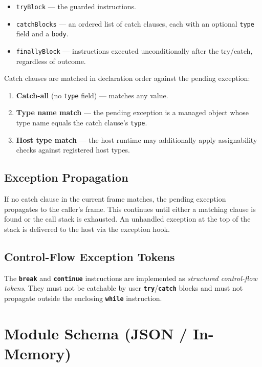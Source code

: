 \documentclass[11pt,a4paper]{article}
\newcommand{\code}[1]{\texttt{\small #1}}
\newcommand{\opcode}[1]{\textbf{\texttt{#1}}}
\begin{document}
\begin{itemize}[leftmargin=1.8em]
  \item \code{tryBlock} --- the guarded instructions.
  \item \code{catchBlocks} --- an ordered list of catch clauses, each with
    an optional \code{type} field and a \code{body}.
  \item \code{finallyBlock} --- instructions executed unconditionally after
    the try/catch, regardless of outcome.
\end{itemize}

Catch clauses are matched in declaration order against the pending exception:

\begin{enumerate}[leftmargin=2em]
  \item \textbf{Catch-all} (no \code{type} field) --- matches any value.
  \item \textbf{Type name match} --- the pending exception is a managed object
    whose type name equals the catch clause's \code{type}.
  \item \textbf{Host type match} --- the host runtime may additionally apply
    assignability checks against registered host types.
\end{enumerate}

\subsection{Exception Propagation}

If no catch clause in the current frame matches, the pending exception
propagates to the caller's frame. This continues until either a matching
clause is found or the call stack is exhausted. An unhandled exception at
the top of the stack is delivered to the host via the exception hook.

\subsection{Control-Flow Exception Tokens}

The \opcode{break} and \opcode{continue} instructions are implemented as
\emph{structured control-flow tokens}. They must not be catchable by user
\opcode{try}/\opcode{catch} blocks and must not propagate outside the
enclosing \opcode{while} instruction.

\section{Module Schema (JSON / In-Memory)}
\label{sec:schema}
\end{document}
